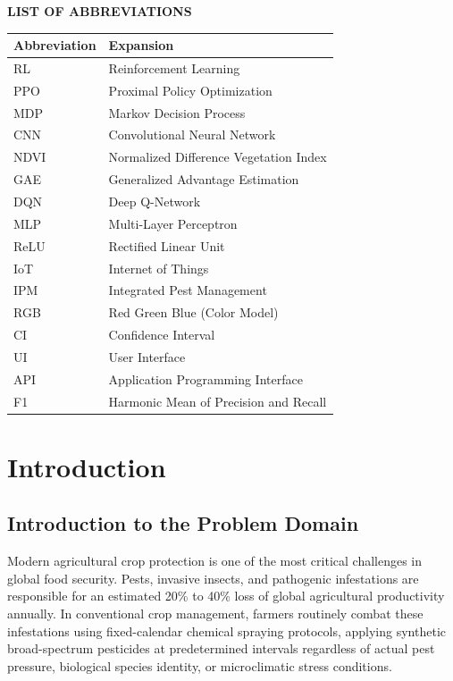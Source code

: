 \documentclass[12pt,a4paper]{report}
\begin{document}
\newpage
\begin{center}
{\Large\bfseries LIST OF ABBREVIATIONS\par}
\end{center}
\vspace{0.8cm}
\begin{table}[H]
\centering
\begin{tabular}{ll}
\toprule
\textbf{Abbreviation} & \textbf{Expansion} \\
\midrule
RL & Reinforcement Learning \\
PPO & Proximal Policy Optimization \\
MDP & Markov Decision Process \\
CNN & Convolutional Neural Network \\
NDVI & Normalized Difference Vegetation Index \\
GAE & Generalized Advantage Estimation \\
DQN & Deep Q-Network \\
MLP & Multi-Layer Perceptron \\
ReLU & Rectified Linear Unit \\
IoT & Internet of Things \\
IPM & Integrated Pest Management \\
RGB & Red Green Blue (Color Model) \\
CI & Confidence Interval \\
UI & User Interface \\
API & Application Programming Interface \\
F1 & Harmonic Mean of Precision and Recall \\
\bottomrule
\end{tabular}
\end{table}

\newpage
{}
\setcounter{page}{1}

\chapter{Introduction}

\section{Introduction to the Problem Domain}
Modern agricultural crop protection is one of the most critical challenges in global food security. Pests, invasive insects, and pathogenic infestations are responsible for an estimated 20\% to 40\% loss of global agricultural productivity annually. In conventional crop management, farmers routinely combat these infestations using fixed-calendar chemical spraying protocols, applying synthetic broad-spectrum pesticides at predetermined intervals regardless of actual pest pressure, biological species identity, or microclimatic stress conditions.
\end{document}

